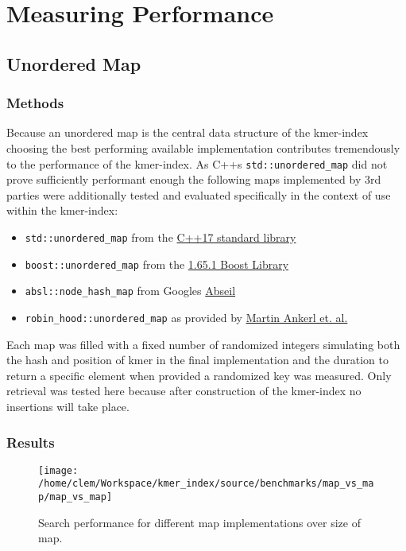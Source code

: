 \chapter{Measuring Performance}

\begin{minipage}{\linewidth}
\section{Unordered Map}
\subsection{Methods}
Because an unordered map is the central data structure of the kmer-index choosing the best performing available
implementation contributes tremendously to the performance of the kmer-index. As C++s \lstinline{std::unordered_map}
did not prove sufficiently performant enough the following maps implemented by 3rd parties were additionally tested and evaluated
specifically in the context of use within the kmer-index:

\begin{itemize}
\item \lstinline{std::unordered_map} from the \href{https://en.cppreference.com/w/cpp/container/unordered_map}{C++17 standard library}
\item \lstinline{boost::unordered_map} from the \href{https://www.boost.org/doc/libs/1_65_0/doc/html/boost/unordered_map.html}{1.65.1 Boost Library}
\item \lstinline{absl::node_hash_map} from Googles \href{https://abseil.io/docs/cpp/guides/container\#abslnode_hash_map-and-abslnode_hash_set}{Abseil}
\item \lstinline{robin_hood::unordered_map} as provided by \href{https://github.com/martinus/robin-hood-hashing}{Martin Ankerl et. al.}
\end{itemize}

Each map was filled with a fixed number of randomized integers simulating both the hash and position of kmer in the
final implementation and the duration to return a specific element when provided a randomized key was measured.
Only retrieval was tested here because after construction of the kmer-index no insertions will take place.

\subsection{Results}
\begin{figure}[H] \label{}
\texttt{[image: /home/clem/Workspace/kmer\_index/source/benchmarks/map\_vs\_map/map\_vs\_map]}

\caption{Search performance for different map implementations over size of
map.}
\end{figure}
\end{minipage}

